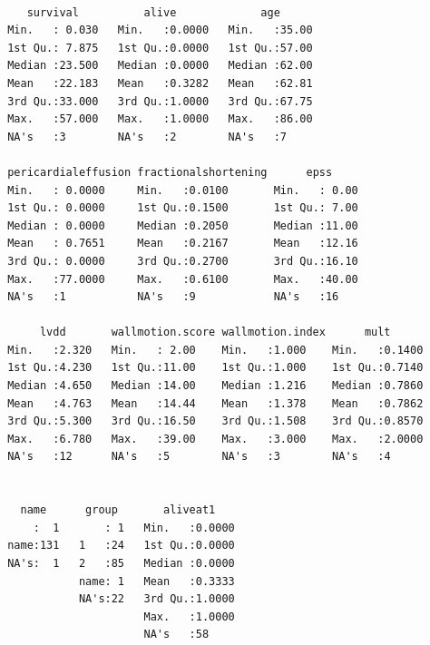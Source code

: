 \documentclass[11pt]{article}
\begin{document}
\begin{lstlisting}[label=DataSummary, caption=Summary of Data, float, frame=tb]

    survival          alive             age       
 Min.   : 0.030   Min.   :0.0000   Min.   :35.00  
 1st Qu.: 7.875   1st Qu.:0.0000   1st Qu.:57.00  
 Median :23.500   Median :0.0000   Median :62.00  
 Mean   :22.183   Mean   :0.3282   Mean   :62.81  
 3rd Qu.:33.000   3rd Qu.:1.0000   3rd Qu.:67.75  
 Max.   :57.000   Max.   :1.0000   Max.   :86.00  
 NA's   :3        NA's   :2        NA's   :7   

 pericardialeffusion fractionalshortening      epss      
 Min.   : 0.0000     Min.   :0.0100       Min.   : 0.00  
 1st Qu.: 0.0000     1st Qu.:0.1500       1st Qu.: 7.00  
 Median : 0.0000     Median :0.2050       Median :11.00  
 Mean   : 0.7651     Mean   :0.2167       Mean   :12.16  
 3rd Qu.: 0.0000     3rd Qu.:0.2700       3rd Qu.:16.10  
 Max.   :77.0000     Max.   :0.6100       Max.   :40.00  
 NA's   :1           NA's   :9            NA's   :16   
 
      lvdd       wallmotion.score wallmotion.index      mult       
 Min.   :2.320   Min.   : 2.00    Min.   :1.000    Min.   :0.1400  
 1st Qu.:4.230   1st Qu.:11.00    1st Qu.:1.000    1st Qu.:0.7140  
 Median :4.650   Median :14.00    Median :1.216    Median :0.7860  
 Mean   :4.763   Mean   :14.44    Mean   :1.378    Mean   :0.7862  
 3rd Qu.:5.300   3rd Qu.:16.50    3rd Qu.:1.508    3rd Qu.:0.8570  
 Max.   :6.780   Max.   :39.00    Max.   :3.000    Max.   :2.0000  
 NA's   :12      NA's   :5        NA's   :3        NA's   :4       


   name      group       aliveat1     
     :  1       : 1   Min.   :0.0000  
 name:131   1   :24   1st Qu.:0.0000  
 NA's:  1   2   :85   Median :0.0000  
            name: 1   Mean   :0.3333  
            NA's:22   3rd Qu.:1.0000  
                      Max.   :1.0000  
                      NA's   :58     

\end{lstlisting}
\end{document}
